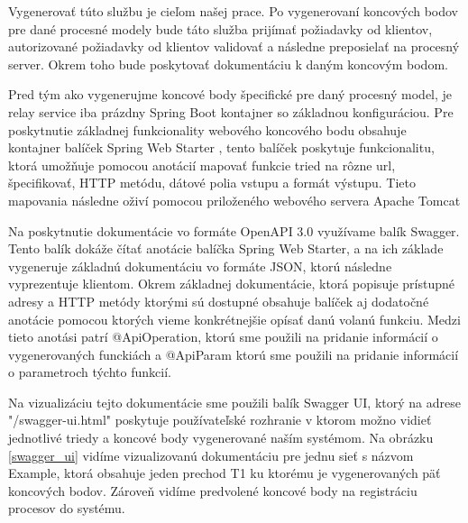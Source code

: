 Vygenerovať túto službu je cieľom našej prace. Po vygenerovaní koncových bodov pre dané procesné modely bude táto služba prijímať požiadavky od klientov, autorizované požiadavky od klientov validovať a následne preposielať na procesný server. Okrem toho bude poskytovať dokumentáciu k daným koncovým bodom.

Pred tým ako vygenerujme koncové body špecifické pre daný procesný model, je relay service iba prázdny Spring Boot kontajner so základnou konfiguráciou. Pre poskytnutie základnej funkcionality webového koncového bodu obsahuje kontajner balíček Spring Web Starter \cite{webstarter}, tento balíček poskytuje funkcionalitu, ktorá umožňuje pomocou anotácií mapovať funkcie tried na rôzne \acrshort{url}, špecifikovať, HTTP metódu, dátové polia vstupu a formát výstupu. Tieto mapovania následne oživí pomocou priloženého webového servera Apache Tomcat \cite{tomcat}

Na poskytnutie dokumentácie vo formáte OpenAPI 3.0 \cite{openapi} využívame balík Swagger. Tento balík dokáže čítať anotácie balíčka Spring Web Starter, a na ich základe vygeneruje základnú dokumentáciu vo formáte JSON, ktorú následne vyprezentuje klientom. Okrem základnej dokumentácie, ktorá popisuje prístupné adresy a HTTP metódy ktorými sú dostupné obsahuje balíček aj dodatočné anotácie pomocou ktorých vieme konkrétnejšie opísať danú volanú funkciu. Medzi tieto anotási patrí @ApiOperation, ktorú sme použili na pridanie informácií o vygenerovaných funckiách a @ApiParam ktorú sme použili na pridanie informácií o parametroch týchto funkcií.

Na vizualizáciu tejto dokumentácie sme použili balík Swagger UI, ktorý na adrese "/swagger-ui.html" poskytuje používateľské rozhranie v ktorom možno vidieť jednotlivé triedy a koncové body vygenerované naším systémom. Na obrázku \ref{swagger_ui} vidíme vizualizovanú dokumentáciu pre jednu sieť s názvom Example, ktorá obsahuje jeden prechod T1 ku ktorému je vygenerovaných päť koncových bodov. Zároveň vidíme predvolené koncové body na registráciu procesov do systému.

